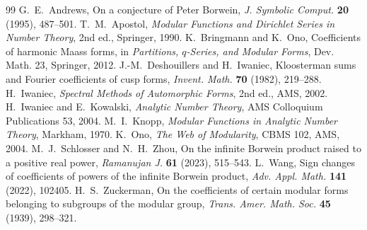 \documentclass[11pt]{amsart}
\theoremstyle{definition}\newtheorem{definition}[theorem]{Definition}
\theoremstyle{remark}\newtheorem{remark}[theorem]{Remark}
\begin{document}
\begin{thebibliography}{99}
 G.~E.~Andrews, On a conjecture of Peter Borwein, \emph{J. Symbolic Comput.} \textbf{20} (1995), 487--501.
 T.~M.~Apostol, \emph{Modular Functions and Dirichlet Series in Number Theory}, 2nd ed., Springer, 1990.
 K.~Bringmann and K.~Ono, Coefficients of harmonic Maass forms, in \emph{Partitions, $q$-Series, and Modular Forms}, Dev. Math. 23, Springer, 2012.
 J.-M.~Deshouillers and H.~Iwaniec, Kloosterman sums and Fourier coefficients of cusp forms, \emph{Invent. Math.} \textbf{70} (1982), 219--288.
 H.~Iwaniec, \emph{Spectral Methods of Automorphic Forms}, 2nd ed., AMS, 2002.
 H.~Iwaniec and E.~Kowalski, \emph{Analytic Number Theory}, AMS Colloquium Publications 53, 2004.
 M.~I.~Knopp, \emph{Modular Functions in Analytic Number Theory}, Markham, 1970.
 K.~Ono, \emph{The Web of Modularity}, CBMS 102, AMS, 2004.
 M.~J.~Schlosser and N.~H.~Zhou, On the infinite Borwein product raised to a positive real power, \emph{Ramanujan J.} \textbf{61} (2023), 515--543.
 L.~Wang, Sign changes of coefficients of powers of the infinite Borwein product, \emph{Adv. Appl. Math.} \textbf{141} (2022), 102405.
 H.~S.~Zuckerman, On the coefficients of certain modular forms belonging to subgroups of the modular group, \emph{Trans. Amer. Math. Soc.} \textbf{45} (1939), 298--321.
\end{thebibliography}
\end{document}

